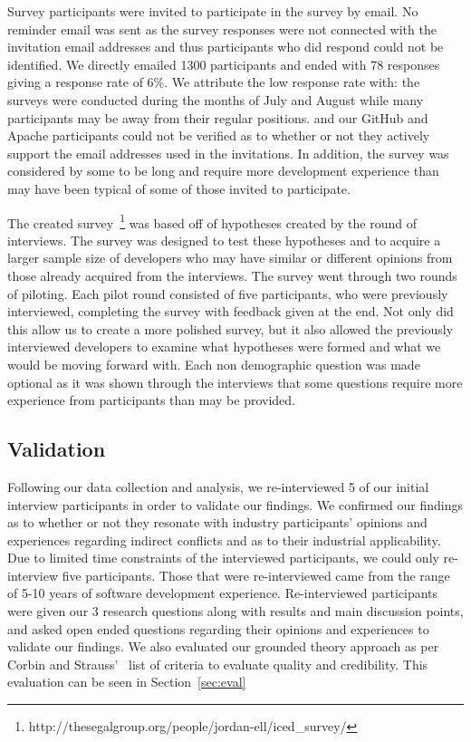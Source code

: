 \documentclass[conference]{IEEEtran}
\begin{document}
Survey participants were invited to participate in the survey by email. No reminder email was sent as the
survey responses were not connected with the invitation email addresses and thus participants who did respond
could not be identified. We directly emailed 1300 participants and ended with 78 responses
giving a response rate of 6\%. We attribute the low response rate with: the surveys
were conducted during the months of July and August while many participants may be away from their regular positions.
and our GitHub and Apache participants could not be verified as to whether or not they actively support the
email addresses used in the invitations. In addition, the survey was considered by some to be long and require
more development experience than may have been typical of some of those invited to participate.

The created survey~\footnote{http://thesegalgroup.org/people/jordan-ell/iced\_survey/}
was based off of hypotheses created by the round of interviews. The survey
was designed to test these hypotheses and to acquire a larger sample size of developers who may have similar
or different opinions from those already acquired from the interviews. The survey went through two rounds of
piloting. Each pilot round consisted of five participants, who were previously interviewed, completing the survey
with feedback given at the end. Not only did this allow us to create a more polished survey, but it also allowed 
the previously interviewed developers to examine what hypotheses were
formed and what we would be moving forward with.
Each non demographic question was made optional as it was shown 
through the interviews that some questions require more experience from participants than may be provided.

\subsection{Validation}

Following our data collection and analysis, we re-interviewed 5 of our initial interview participants
in order to validate our findings. We confirmed our findings as to whether or not they resonate with 
industry participants' opinions and experiences regarding indirect conflicts and as to their industrial 
applicability. Due to limited time constraints of the interviewed participants, we could only re-interview
five participants. Those that were re-interviewed came from the range of 5-10 years of software development
experience. Re-interviewed participants were given our 3 research questions along with results and main
discussion points, and asked open ended questions regarding their opinions and experiences to validate our 
findings. We also evaluated our grounded theory approach as per Corbin and Strauss'~\cite{Corbin:1998:SP}
list of criteria to evaluate quality and credibility. This evaluation can be seen in Section~\ref{sec:eval}
\end{document}
